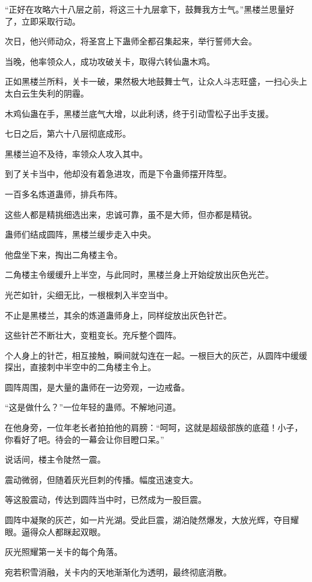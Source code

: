 \begin{this_body}
“正好在攻略六十八层之前，将这三十九层拿下，鼓舞我方士气。”黑楼兰思量好了，立即采取行动。

次日，他兴师动众，将圣宫上下蛊师全都召集起来，举行誓师大会。

当晚，他率领众人，成功攻破关卡，取得六转仙蛊木鸡。

正如黑楼兰所料，关卡一破，果然极大地鼓舞士气，让众人斗志旺盛，一扫心头上太白云生失利的阴霾。

木鸡仙蛊在手，黑楼兰底气大增，以此利诱，终于引动雪松子出手支援。

七日之后，第六十八层彻底成形。

黑楼兰迫不及待，率领众人攻入其中。

到了关卡当中，他却没有着急进攻，而是下令蛊师摆开阵型。

一百多名炼道蛊师，排兵布阵。

这些人都是精挑细选出来，忠诚可靠，虽不是大师，但亦都是精锐。

蛊师们结成圆阵，黑楼兰缓步走入中央。

他盘坐下来，掏出二角楼主令。

二角楼主令缓缓升上半空，与此同时，黑楼兰身上开始绽放出灰色光芒。

光芒如针，尖细无比，一根根刺入半空当中。

不止是黑楼兰，其余的炼道蛊师身上，同样绽放出灰色针芒。

这些针芒不断壮大，变粗变长。充斥整个圆阵。

个人身上的针芒，相互接触，瞬间就勾连在一起。一根巨大的灰芒，从圆阵中缓缓探出，直接刺中半空中的二角楼主令上。

圆阵周围，是大量的蛊师在一边旁观，一边戒备。

“这是做什么？”一位年轻的蛊师。不解地问道。

在他身旁，一位年老长者拍拍他的肩膀：“呵呵，这就是超级部族的底蕴！小子，你看好了吧。待会的一幕会让你目瞪口呆。”

说话间，楼主令陡然一震。

震动微弱，但随着灰光巨刺的传播。幅度迅速变大。

等这股震动，传达到圆阵当中时，已然成为一股巨震。

圆阵中凝聚的灰芒，如一片光湖。受此巨震，湖泊陡然爆发，大放光辉，夺目耀眼。逼得众人都眯起双眼。

灰光照耀第一关卡的每个角落。

宛若积雪消融，关卡内的天地渐渐化为透明，最终彻底消散。


\end{this_body}
